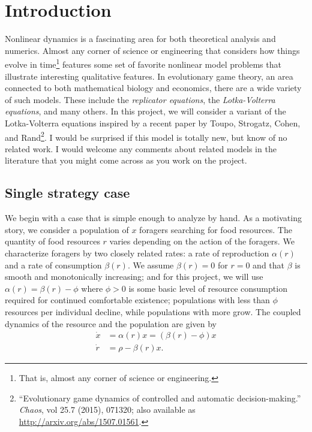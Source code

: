 \documentclass[12pt, leqno]{article} %
\begin{document}

\section{Introduction}

Nonlinear dynamics is a fascinating area for both theoretical
analysis and numerics.  Almost any corner of science or engineering
that considers how things evolve in time\footnote{%
That is, almost any corner of science or engineering.}
features some set of favorite nonlinear model problems
that illustrate interesting qualitative features.
In evolutionary game theory, an area connected to both
mathematical biology and economics, there are a wide variety
of such models.  These include the {\em replicator equations},
the {\em Lotka-Volterra equations}, and many others.  In this
project, we will consider a variant of the Lotka-Volterra
equations inspired by a recent paper by Toupo, Strogatz, Cohen,
and Rand\footnote{%
``Evolutionary game dynamics of controlled and automatic
  decision-making.''
  {\em Chaos}, vol 25.7 (2015), 071320; also available as
  \url{http://arxiv.org/abs/1507.01561}.
}.
I would be surprised if this model is totally new, but know
of no related work.  I would welcome any comments about related
models in the literature that you might come across as you
work on the project.

\subsection{Single strategy case}

We begin with a case that is simple enough to analyze by hand.  As a
motivating story, we consider a population of $x$ foragers searching
for food resources.  The quantity of food resources $r$ varies
depending on the action of the foragers.  We characterize foragers by
two closely related rates: a rate of reproduction $\alpha(r)$ and a
rate of consumption $\beta(r)$.  We assume $\beta(r) = 0$ for $r = 0$
and that $\beta$ is smooth and monotonically increasing; and for this
project, we will use $\alpha(r) = \beta(r)-\phi$ where $\phi > 0$ is
some basic level of resource consumption required for continued
comfortable existence; populations with less than $\phi$ resources per
individual decline, while populations with more grow.  The coupled
dynamics of the resource and the population are given by
\begin{align*}
  \dot{x} &= \alpha(r) x = (\beta(r)-\phi) x \\
  \dot{r} &= \rho - \beta(r) x.
\end{align*}
\end{document}
